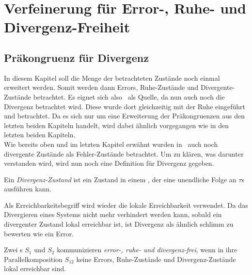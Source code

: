 \chapter{Verfeinerung für Error-, Ruhe- und Divergenz-Freiheit}

\section{Präkongruenz für Divergenz}

In diesem Kapitel soll die Menge der betrachteten Zustände noch einmal
erweitert werden. Somit werden dann Errors, Ruhe-Zustände und
Divergente-Zustände betrachtet. Es eignet sich also~\cite{Chilton2013} als
Quelle, da nun auch noch die Divergenz betrachtet wird. Diese wurde dort
gleichzeitig mit der Ruhe eingeführt und betrachtet. Da es sich nur um eine
Erweiterung der Präkongruenzen aus den letzten beiden Kapiteln handelt, wird
dabei ähnlich vorgegangen wie in den letzten beiden Kapiteln.\\
Wie bereits oben und im letzten Kapitel erwähnt wurden in~\cite{Chilton2013}
auch noch divergente Zustände als Fehler-Zustände betrachtet. Um zu klären, was
darunter verstanden wird, wird nun noch eine Definition für Divergenz gegeben.

\begin{Def}[Divergenz]
  Ein \emph{Divergenz-Zustand} ist ein Zustand in einem \EIO{}, der eine
  unendliche Folge an $\tau$s ausführen kann.%
\end{Def}

Als Erreichbarkeitsbegriff wird wieder die lokale Erreichbarkeit verwendet.
Da das Divergieren eines Systems nicht mehr verhindert werden kann, sobald ein
divergenter Zustand lokal erreichbar ist, ist Divergenz als ähnlich
\glqq{}schlimm\grqq{} zu bewerten wie ein Error.

\begin{Def}
  Zwei \EIO{}s $S_1$ und $S_2$ kommunizieren \emph{error-, ruhe- und
  divergenz-frei}, wenn in ihre Parallelkomposition $S_{12}$ keine Errors,
  Ruhe-Zustände und Divergenz-Zustände lokal erreichbar sind.
\end{Def}

